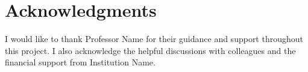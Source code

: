 \documentclass[12pt,a4paper]{article}
\theoremstyle{definition}
\begin{document}
\section*{Acknowledgments}

I would like to thank Professor Name for their guidance and support throughout
this project. I also acknowledge the helpful discussions with colleagues and
the financial support from Institution Name.

\newpage


\end{document}
